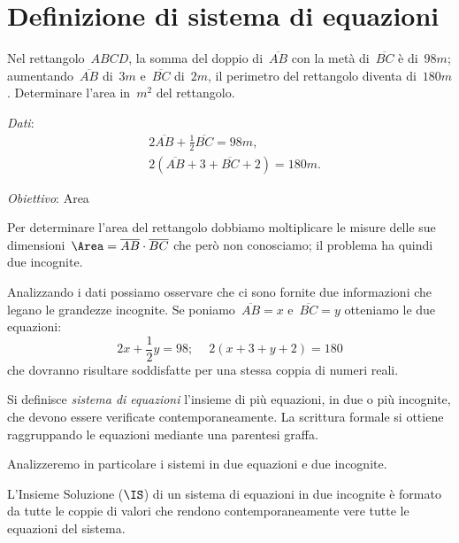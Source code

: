 \section{Definizione di sistema di equazioni}
\begin{problema}
\label{pr:22.1}
Nel rettangolo~$ABCD$, la somma del doppio di~$\overline{AB}$ con la metà di~$\overline{BC}$ è
di~$98\unit{m}$; aumentando~$\overline{AB}$ di~$3\unit{m}$ e~$\overline{BC}$ di~$2\unit{m}$, il perimetro del rettangolo
diventa di~$180\unit{m}$. Determinare l'area in~$\unit{m}^{2}$ del rettangolo.
\end{problema}
\begin{multicols}{2}
\emph{Dati}:
\begin{align*}
&2\overline{AB}+\frac{1}{2}\overline{BC}=98\unit{m}\text{,}\\
&2(\overline{AB}+3+\overline{BC}+2)=180\unit{m}.
\end{align*}

\emph{Obiettivo}: Area

\begin{center}
 
\end{center}
\end{multicols}
 \begin{soluzione}
Per determinare l'area del rettangolo dobbiamo
moltiplicare le misure delle sue dimensioni~$\Area=\overline{AB}\cdot\overline{BC}$
che però non conosciamo; il problema ha quindi due incognite.

Analizzando i dati possiamo osservare che ci sono fornite due
informazioni che legano le grandezze incognite. Se poniamo~$\overline{AB}=x$ e~$\overline{BC}=y$
otteniamo le due equazioni:
\[2x+\frac{1}{2}y=98;\quad~2(x+3+y+2)=180\]
che dovranno risultare soddisfatte per una stessa coppia di numeri
reali.
 \end{soluzione}

 \begin{definizione}
Si definisce \emph{sistema di equazioni} l'insieme di più equazioni, in due o più incognite,
che devono essere verificate contemporaneamente. La scrittura formale
si ottiene raggruppando le equazioni mediante una parentesi graffa.
\end{definizione}

Analizzeremo in particolare i sistemi in due equazioni e due incognite.

\begin{definizione}
L'Insieme Soluzione ($\IS$) di un sistema di equazioni in
due incognite è formato da tutte le coppie di valori
che rendono contemporaneamente vere tutte le equazioni del sistema.
\end{definizione}

